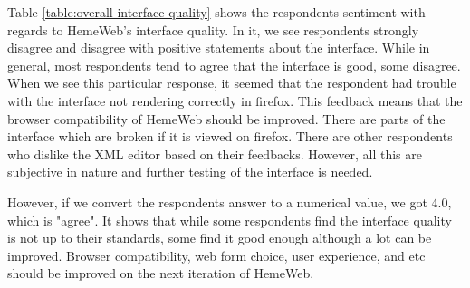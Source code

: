 Table \ref{table:overall-interface-quality} shows the respondents sentiment with regards to HemeWeb's interface quality. In it, we see respondents strongly disagree and disagree with positive statements about the interface. While in general, most respondents tend to agree that the interface is good, some disagree. When we see this particular response, it seemed that the respondent had trouble with the interface not rendering correctly in firefox. This feedback means that the browser compatibility of HemeWeb should be improved. There are parts of the interface which are broken if it is viewed on firefox. There are other respondents who dislike the XML editor based on their feedbacks. However, all this are subjective in nature and further testing of the interface is needed.

However, if we convert the respondents answer to a numerical value, we got 4.0, which is "agree". It shows that while some respondents find the interface quality is not up to their standards, some find it good enough although a lot can be improved. Browser compatibility, web form choice, user experience, and etc should be improved on the next iteration of HemeWeb.



\begin{center}
\label{table:overall-satisfaction}
\end{center}
\vspace{0.5cm}

